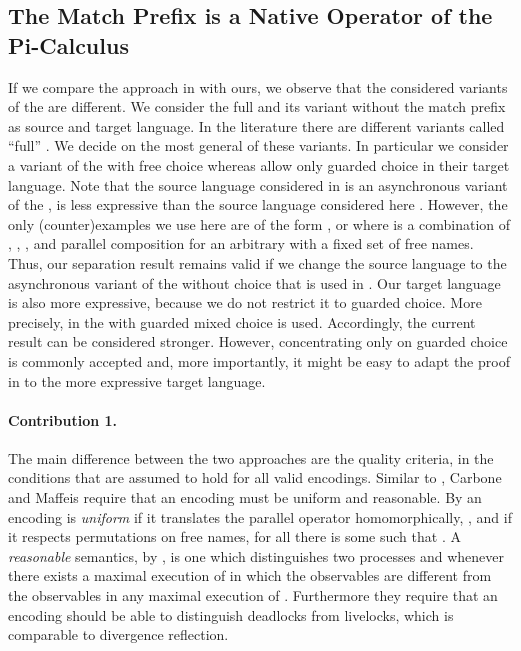 \documentclass[]{article}
\begin{document}
\subsection{The Match Prefix is a Native Operator of the Pi-Calculus}
\label{sec:comparison}

If we compare the approach in \cite{carbone} with ours, we observe that the considered variants of the \piCal are different.
We consider the full \piCal and its variant without the match prefix as source and target language.
In the literature there are different variants called ``full'' \piCal. We decide on the most general of these variants. In particular we consider a variant of the \piCal with free choice whereas \cite{carbone} allow only guarded choice in their target language.
Note that the source language considered in \cite{carbone} is an asynchronous variant of the \piCal, \ie is less expressive than the source language considered here \cite{palamidessi03,petersNestmann14,petersNestmannGoltz13}.
However, the only (counter)examples we use here are of the form , or  where  is a combination of , , , and parallel composition for an arbitrary  with a fixed set of free names. Thus, our separation result remains valid if we change the source language to the asynchronous variant of the \piCal without choice that is used in \cite{carbone}.
Our target language is also more expressive, because we do not restrict it to guarded choice. More precisely, in \cite{carbone} the \piCal with guarded mixed choice is used. Accordingly, the current result can be considered stronger. However, concentrating only on guarded choice is commonly accepted and, more importantly, it might be easy to adapt the proof in \cite{carbone} to the more expressive target language.

\paragraph{Contribution 1.}
The main difference between the two approaches are the quality criteria, \ie in the conditions that are assumed to hold for all valid encodings.
Similar to \cite{palamidessi03}, Carbone and Maffeis require that an encoding must be uniform and reasonable.
By \cite{carbone} an encoding  is \emph{uniform} if it translates the parallel operator homomorphically, \ie , and if it respects permutations on free names, \ie for all  there is some  such that .
A \emph{reasonable} semantics, by \cite{carbone}, is one which distinguishes two processes  and  whenever there exists a maximal execution of  in which the observables are different from the observables in any maximal execution of .
Furthermore they require that an encoding should be able to distinguish deadlocks from livelocks, which is comparable to divergence reflection.
\end{document}

